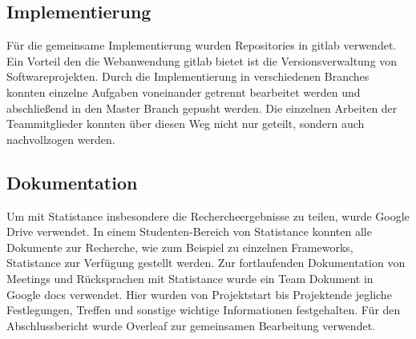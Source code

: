 \subsection*{\textbf{Implementierung}}
Für die gemeinsame Implementierung wurden Repositories in gitlab verwendet. Ein Vorteil den die Webanwendung gitlab bietet ist die Versionsverwaltung von Softwareprojekten. Durch die Implementierung in verschiedenen Branches konnten einzelne Aufgaben voneinander getrennt bearbeitet werden und abschließend in den Master Branch gepusht werden. Die einzelnen Arbeiten der Teammitglieder konnten über diesen Weg nicht nur geteilt, sondern auch nachvollzogen werden.

\subsection*{\textbf{Dokumentation}}
Um mit Statistance insbesondere die Rechercheergebnisse zu teilen, wurde Google Drive verwendet. In einem Studenten-Bereich von Statistance konnten alle Dokumente zur Recherche, wie zum Beispiel zu einzelnen Frameworks, Statistance zur Verfügung gestellt werden. Zur fortlaufenden Dokumentation von Meetings und Rücksprachen mit Statistance wurde ein Team Dokument in Google docs verwendet. Hier wurden von Projektstart bis Projektende jegliche Festlegungen, Treffen und sonstige wichtige Informationen festgehalten. Für den Abschlussbericht wurde Overleaf zur gemeinsamen Bearbeitung verwendet.


